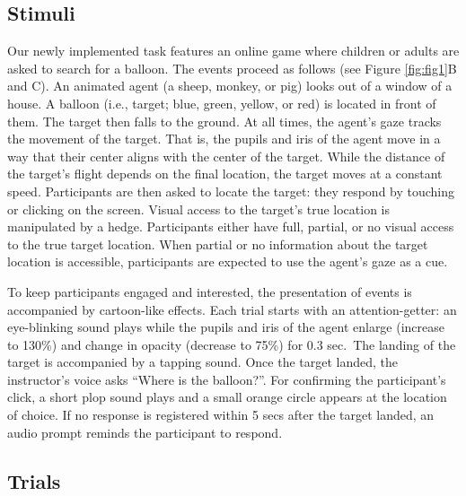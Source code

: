 \documentclass[
  man,floatsintext]{apa6}
\begin{document}
\hypertarget{stimuli}{%
\subsection{Stimuli}\label{stimuli}}

Our newly implemented task features an online game where children or adults are asked to search for a balloon. The events proceed as follows (see Figure \ref{fig:fig1}B and C). An animated agent (a sheep, monkey, or pig) looks out of a window of a house. A balloon (i.e., target; blue, green, yellow, or red) is located in front of them. The target then falls to the ground. At all times, the agent's gaze tracks the movement of the target. That is, the pupils and iris of the agent move in a way that their center aligns with the center of the target. While the distance of the target's flight depends on the final location, the target moves at a constant speed. Participants are then asked to locate the target: they respond by touching or clicking on the screen. Visual access to the target's true location is manipulated by a hedge. Participants either have full, partial, or no visual access to the true target location. When partial or no information about the target location is accessible, participants are expected to use the agent's gaze as a cue.

To keep participants engaged and interested, the presentation of events is accompanied by cartoon-like effects. Each trial starts with an attention-getter: an eye-blinking sound plays while the pupils and iris of the agent enlarge (increase to 130\%) and change in opacity (decrease to 75\%) for 0.3 sec.~The landing of the target is accompanied by a tapping sound. Once the target landed, the instructor's voice asks ``Where is the balloon?''. For confirming the participant's click, a short plop sound plays and a small orange circle appears at the location of choice. If no response is registered within 5 secs after the target landed, an audio prompt reminds the participant to respond.

\hypertarget{trials}{%
\subsection{Trials}\label{trials}}
\end{document}
